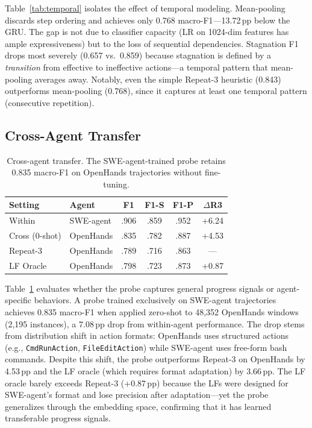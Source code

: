 \documentclass[11pt,a4paper]{article}
\begin{document}
Table~\ref{tab:temporal} isolates the effect of temporal modeling.
Mean-pooling discards step ordering and achieves only 0.768 macro-F1---13.72\,pp below the GRU.
The gap is not due to classifier capacity (LR on 1024-dim features has ample expressiveness) but to the loss of sequential dependencies.
Stagnation F1 drops most severely (0.657 vs.\ 0.859) because stagnation is defined by a \emph{transition} from effective to ineffective actions---a temporal pattern that mean-pooling averages away.
Notably, even the simple Repeat-3 heuristic (0.843) outperforms mean-pooling (0.768), since it captures at least one temporal pattern (consecutive repetition).

\subsection{Cross-Agent Transfer}
\label{sec:cross-agent}

\begin{table}[t]
\centering
\small
\begin{tabular}{llcccc}
\toprule
\textbf{Setting} & \textbf{Agent} & \textbf{F1} & \textbf{F1-S} & \textbf{F1-P} & \textbf{$\Delta$R3} \\
\midrule
Within & SWE-agent & .906 & .859 & .952 & +6.24 \\
Cross (0-shot) & OpenHands & .835 & .782 & .887 & +4.53 \\
Repeat-3 & OpenHands & .789 & .716 & .863 & --- \\
LF Oracle & OpenHands & .798 & .723 & .873 & +0.87 \\
\bottomrule
\end{tabular}
\caption{Cross-agent transfer. The SWE-agent-trained probe retains 0.835 macro-F1 on OpenHands trajectories without fine-tuning.}
\label{tab:cross-agent}
\end{table}

Table~\ref{tab:cross-agent} evaluates whether the probe captures general progress signals or agent-specific behaviors.
A probe trained exclusively on SWE-agent trajectories achieves 0.835 macro-F1 when applied zero-shot to 48,352 OpenHands windows (2,195 instances), a 7.08\,pp drop from within-agent performance.
The drop stems from distribution shift in action formats: OpenHands uses structured actions (e.g., \texttt{CmdRunAction}, \texttt{FileEditAction}) while SWE-agent uses free-form bash commands.
Despite this shift, the probe outperforms Repeat-3 on OpenHands by 4.53\,pp and the LF oracle (which requires format adaptation) by 3.66\,pp.
The LF oracle barely exceeds Repeat-3 (+0.87\,pp) because the LFs were designed for SWE-agent's format and lose precision after adaptation---yet the probe generalizes through the embedding space, confirming that it has learned transferable progress signals.
\end{document}
